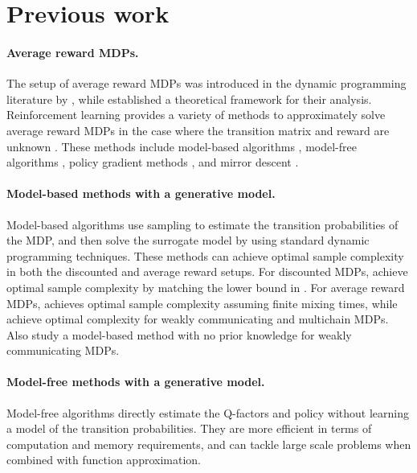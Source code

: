 \section{Previous work}
\label{sec:prev_work}
\paragraph{Average reward MDPs.}
The setup of average reward MDPs was introduced  in the dynamic programming literature by \citet{howard1960dynamic}, while \citet{blackwell1962discrete} established a theoretical framework for their analysis. Reinforcement learning provides a variety of methods to approximately solve average reward MDPs in the case where the transition matrix and reward are unknown \citep{mahadevan1996average, dewanto2020average}. These methods include model-based algorithms \citep{jin2021towards, zurek2024span}, model-free algorithms \citep{wei2020model, wan2021learning}, policy gradient methods \citep{bai2024regret, kumar2024global}, and mirror descent  \citep{murthy2023convergence}. 


\paragraph{Model-based methods with a generative model.}
Model-based algorithms use sampling to estimate the transition probabilities of the MDP, and then solve the surrogate model by using standard dynamic programming techniques. These methods can achieve optimal sample complexity in both the discounted and average reward setups. For discounted MDPs, \citet{agarwal2020model, li2020breaking} achieve optimal sample complexity by matching the lower bound in \citet{gheshlaghi2013minimax}. For average reward MDPs,  \citet{wang2023optimal} achieves optimal sample complexity assuming finite mixing times, while  \citet{zurek2024span} achieve optimal complexity for weakly communicating and multichain MDPs. Also \citet{tuynman2024finding} study a model-based method with no prior knowledge  for weakly communicating MDPs. 

\paragraph{Model-free methods with a generative model.}
Model-free algorithms directly estimate the Q-factors and policy without learning a model of the transition probabilities. They are more efficient in terms of  computation and memory requirements, and can tackle large scale problems when combined with function approximation. 

